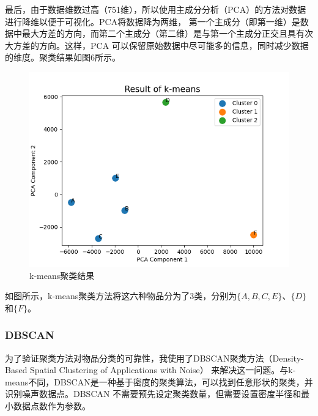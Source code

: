 \documentclass[12pt,a4paper]{article}
\begin{document}
最后，由于数据维数过高（751维），所以使用主成分分析（PCA）的方法对数据进行降维以便于可视化。PCA将数据降为两维，
第一个主成分（即第一维）是数据中最大方差的方向，而第二个主成分（第二维）是与第一个主成分正交且具有次大方差的方向。这样，PCA 可以保留原始数据中尽可能多的信息，同时减少数据的维度。聚类结果如图6所示。
\begin{figure}[h]
    \centering
    \includegraphics[scale=0.9]{fig6.png}
    \caption{k-means聚类结果}
    \label{fig:6}
\end{figure}

如图所示，k-means聚类方法将这六种物品分为了3类，分别为$\{A, B, C, E\}$、$\{D\}$和$\{F\}$。

\subsubsection{DBSCAN}
为了验证聚类方法对物品分类的可靠性，我使用了DBSCAN聚类方法（Density-Based Spatial Clustering of Applications with Noise）
来解决这一问题。与k-means不同，DBSCAN是一种基于密度的聚类算法，可以找到任意形状的聚类，并识别噪声数据点。DBSCAN 不需要预先设定聚类数量，但需要设置密度半径和最小数据点数作为参数。
\end{document}
